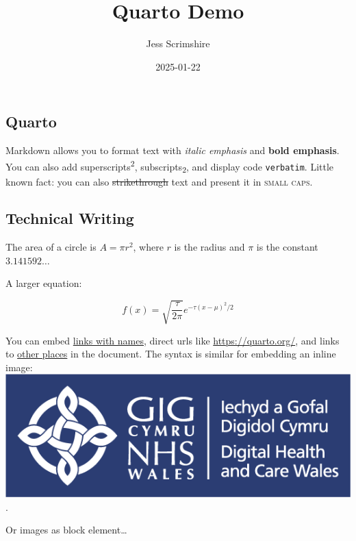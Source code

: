 \documentclass[
  letterpaper,
  DIV=11,
  numbers=noendperiod]{scrartcl}
\title{Quarto Demo}
\author{Jess Scrimshire}
\date{2025-01-22}
\begin{document}
\maketitle


\subsection{Quarto}\label{quarto}

Markdown allows you to format text with \emph{italic emphasis} and
\textbf{bold emphasis}. You can also add
superscripts\textsuperscript{2}, subscripts\textsubscript{2}, and
display code \texttt{verbatim}. Little known fact: you can also
\st{strikethrough} text and present it in \textsc{small caps}.

\subsection{Technical Writing}\label{technical-writing}

The area of a circle is \(A = \pi r^2\), where \(r\) is the radius and
\(\pi\) is the constant \(3.141592\ldots\)

A larger equation:

\[
f(x)={\sqrt{\frac{\tau}{2\pi}}}
      e^{-\tau (x-\mu )^{2}/2}
\]

You can embed \href{https://quarto.org/}{links with names}, direct urls
like \url{https://quarto.org/}, and links to
\hyperref[inline-elements-text-formatting]{other places} in the
document. The syntax is similar for embedding an inline image:
\includegraphics[width=0.2\linewidth,height=\textheight,keepaspectratio]{images/dhcw.png}.

Or images as block element\ldots{}
\end{document}

